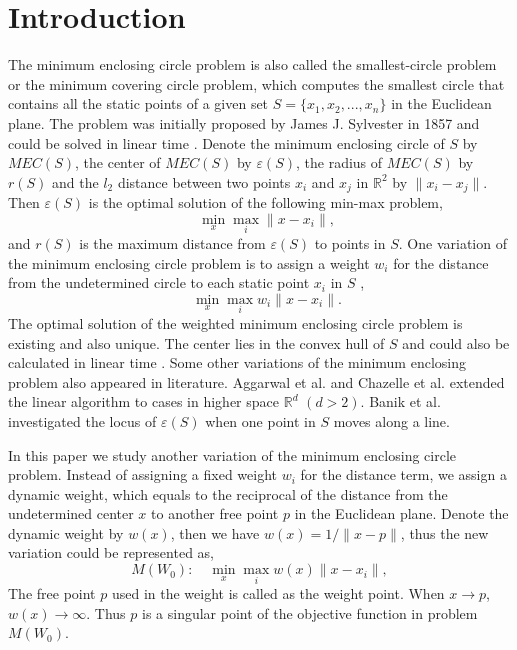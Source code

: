 \documentclass[final,3p,times]{elsarticle}
\begin{document}
\newtheorem{defn}{Definition}[section]
\newtheorem{Theorem}{Theorem}[section]
\newtheorem{Lemma}{Lemma}[section]
\newtheorem{Observation}{Observation}[section]
\newtheorem{Corollary}{Corollary}[section]
\newtheorem{Fact}{Fact}[section]

\section{Introduction}
The minimum enclosing circle problem is also called the smallest-circle problem or the minimum covering circle problem, which computes the smallest circle that contains all the static points of a given set $S=\{x_1,x_2,...,x_n\}$ in the Euclidean plane. The problem was initially proposed by James J. Sylvester in 1857 \cite{sylvester1857question} and could be solved in linear time \cite{megiddo1983linear,Welzl1991}. Denote the minimum enclosing circle of $S$ by $MEC(S)$, the center of $MEC(S)$ by $\varepsilon(S)$, the radius of $MEC(S)$ by $r(S)$ and the $l_2$ distance between two points $x_i$ and $x_j$ in $\mathbb{R}^2$ by $\|x_i-x_j\|$. Then $\varepsilon(S)$ is the optimal solution of the following min-max problem,
\begin{equation*}
\quad \min_{x}\max_{i}\|x-x_i\|, %
\end{equation*}
and $r(S)$ is the maximum distance from $\varepsilon(S)$ to points in $S$. One variation of the minimum enclosing circle problem is to assign a weight $w_i$ for the distance from the undetermined circle to each static point $x_i$ in $S$ \cite{dearing2013dual},
\begin{equation*}
\quad \min_{x}\max_{i}w_i\|x-x_i\|.
\end{equation*}
The optimal solution of the weighted minimum enclosing circle problem is existing and also unique. The center lies in the convex hull of $S$ \cite{hearn1982efficient} and could also be calculated in linear time \cite{megiddo1983weighted}. Some other variations of the minimum enclosing problem also appeared in literature. Aggarwal et al. \cite{Aggarwal1989} and Chazelle et al. \cite{chazelle1996linear} extended the linear algorithm to cases in higher space $\mathbb{R}^d$ $(d>2)$. Banik et al. \cite{Banik2014} investigated the locus of $\varepsilon(S)$ when one point in $S$ moves along a line.

In this paper we study another variation of the minimum enclosing circle problem. Instead of assigning a fixed weight $w_i$ for the distance term, we assign a dynamic weight, which equals to the reciprocal of the distance from the undetermined center $x$ to another free point $p$ in the Euclidean plane. Denote the dynamic weight by $w(x)$, then we have $w(x)=1/\|x-p\|$, thus the new variation could be represented as,
\begin{equation*}
M(W_0):\quad \min_{x}\max_{i}w(x)\|x-x_i\|,
\end{equation*}
The free point $p$ used in the weight is called as the weight point. When $x\rightarrow p$, $w(x)\rightarrow\infty$. Thus $p$ is a singular point of the objective function in problem $M(W_0)$.
\end{document}
